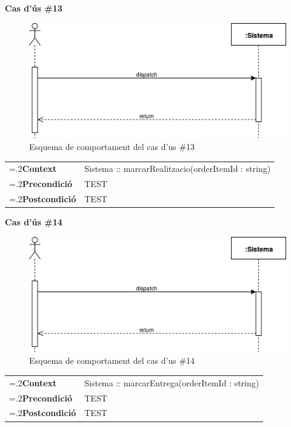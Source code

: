 \clearpage
\noindent\textbf{\large Cas d'ús \#13}\\
\begin{figure}[H]
\centering
\includegraphics[scale=0.6]{Figures/casdus_00.png}
\caption{Esquema de comportament del cas d'us \#13}
\end{figure}
\begin{table}[h]
\noindent
\begin{tabularx}{\linewidth}{
>{\hsize=.2\hsize}X%
>{\hsize=0.8\hsize}X%
}
\textbf{Context} 		& Sistema :: marcarRealitzacio(orderItemId : string) \\
\textbf{Precondició} 	& TEST \\
\textbf{Postcondició}	& TEST \\
\end{tabularx}
\label{}
\end{table}

\noindent\textbf{\large Cas d'ús \#14}\\
\begin{figure}[H]
\centering
\includegraphics[scale=0.6]{Figures/casdus_00.png}
\caption{Esquema de comportament del cas d'us \#14}
\end{figure}
\begin{table}[h]
\noindent
\begin{tabularx}{\linewidth}{
>{\hsize=.2\hsize}X%
>{\hsize=0.8\hsize}X%
}
\textbf{Context} 		& Sistema :: marcarEntrega(orderItemId : string) \\
\textbf{Precondició} 	& TEST \\
\textbf{Postcondició}	& TEST \\
\end{tabularx}
\label{}
\end{table}

